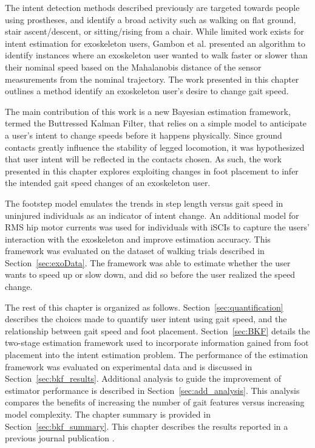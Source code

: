 The intent detection methods described previously are targeted towards people using prostheses, and identify a broad activity such as walking on flat ground, stair ascent/descent, or sitting/rising from a chair. While limited work exists for intent estimation for exoskeleton users, Gambon et al. presented an algorithm \cite{Gambon20b} to identify instances where an exoskeleton user wanted to walk faster or slower than their nominal speed based on the Mahalanobis distance of the sensor measurements from the nominal trajectory. The work presented in this chapter outlines a method identify an exoskeleton user's desire to change gait speed. 

The main contribution of this work is a new Bayesian estimation framework, termed the Buttressed Kalman Filter, that relies on a simple model to anticipate a user's intent to change speeds before it happens physically. Since ground contacts greatly influence the stability of legged locomotion, it was hypothesized that user intent will be reflected in the contacts chosen. As such, the work presented in this chapter explores exploiting changes in foot placement to infer the intended gait speed changes of an exoskeleton user. 

The footstep model emulates the trends in step length versus gait speed in uninjured individuals as an indicator of intent change. An additional model for RMS hip motor currents was used for individuals with iSCIs to capture the users' interaction with the exoskeleton and improve estimation accuracy. This framework was evaluated on the dataset of walking trials described in Section~\ref{sec:exoData}. The framework was able to estimate whether the user wants to speed up or slow down, and did so before the user realized the speed change.

The rest of this chapter is organized as follows. Section~\ref{sec:quantification} describes the choices made to quantify user intent using gait speed, and the relationship between gait speed and foot placement. Section~\ref{sec:BKF} details the two-stage estimation framework used to incorporate information gained from foot placement into the intent estimation problem. The performance of the estimation framework was evaluated on experimental data and is discussed in Section~\ref{sec:bkf_results}. Additional analysis to guide the improvement of estimator performance is described in Section~\ref{sec:add_analysis}. This analysis compares the benefits of increasing the number of gait features versus increasing model complexity. The chapter summary is provided in Section~\ref{sec:bkf_summary}. This chapter describes the results reported in a previous journal publication \cite{karulkar2021using}.

